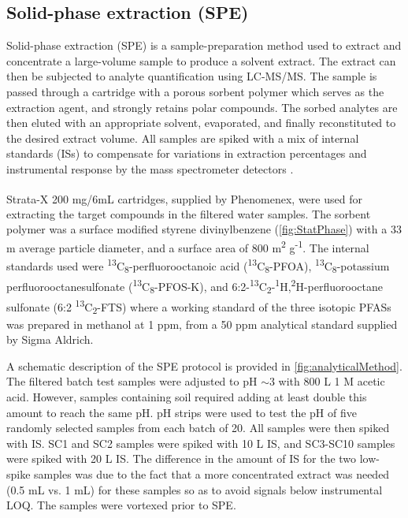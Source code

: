 \subsection{Solid-phase extraction (SPE)}
Solid-phase extraction (\acrshort{SPE}) is a sample-preparation method used to extract and concentrate a large-volume sample to produce a solvent extract. The extract can then be subjected to analyte quantification using LC-MS/MS. The sample is passed through a cartridge with a porous sorbent polymer which serves as the extraction agent, and strongly retains polar compounds. The sorbed analytes are then eluted with an appropriate solvent, evaporated, and finally reconstituted to the desired extract volume. All samples are spiked with a mix of internal standards (\acrshort{IS}s) to compensate for variations in extraction percentages and instrumental response by the mass spectrometer detectors \citep{arvaniti2014}.

Strata-X\textsuperscript{\textregistered} 200 mg/6mL cartridges, supplied by Phenomenex, were used for extracting the target compounds in the filtered water samples. The sorbent polymer was a surface modified styrene divinylbenzene (\cref{fig:StatPhase}) with a 33 \textmu m average particle diameter, and a surface area of 800 m\textsuperscript{2} g\textsuperscript{-1}. The internal standards used were \textsuperscript{13}C\textsubscript{8}-perfluorooctanoic acid (\textsuperscript{13}C\textsubscript{8}-PFOA), \textsuperscript{13}C\textsubscript{8}-potassium perfluorooctanesulfonate (\textsuperscript{13}C\textsubscript{8}-PFOS-K), and 6:2-\textsuperscript{13}C\textsubscript{2}-\textsuperscript{1}H,\textsuperscript{2}H-perfluorooctane sulfonate (6:2 \textsuperscript{13}C\textsubscript{2}-FTS) where a working standard of the three isotopic PFASs was prepared in methanol at 1 ppm, from a 50 ppm analytical standard supplied by Sigma Aldrich.

A schematic description of the SPE protocol is provided in \cref{fig:analyticalMethod}. The filtered batch test samples were adjusted to pH $\sim$3 with 800 \textmu L 1 M acetic acid. However, samples containing soil required adding at least double this amount to reach the same pH. pH strips were used to test the pH of five randomly selected samples from each batch of 20. All samples were then spiked with IS. SC1 and SC2 samples were spiked with 10 \textmu L IS, and SC3-SC10 samples were spiked with 20 \textmu L IS. The difference in the amount of IS for the two low-spike samples was due to the fact that a more concentrated extract was needed (0.5 mL vs. 1 mL) for these samples so as to avoid signals below instrumental \acrshort{LOQ}. The samples were vortexed prior to SPE.

